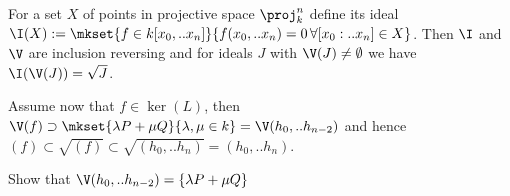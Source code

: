 \begin{theorem}
For a set $X$ of points in projective space $\proj^n_k$ define its ideal $\I(X) := \mkset{f \in k[x_0,..x_n]}{f(x_0,..x_n) = 0\,\forall [x_0:..x_n] \in X}$.
Then $\I$ and $\V$ are inclusion reversing and for ideals $J$ with $\V(J) \neq \emptyset$ we have $\I(\V(J)) = \sqrt{J}$.
\end{theorem}

Assume now that $f \in \ker(L)$, then $\V(f) \supset \mkset{\lambda P + \mu Q}{\lambda, \mu \in k} = \V(h_0,..h_{n-2})$ and hence $(f) \subset \sqrt{(f)} \subset \sqrt{(h_0,..h_n)} = (h_0,..h_n)$.

\begin{todo}
\item Show that $\V(h_0,..h_{n-2}) = \{ \lambda P + \mu Q \}$
\end{todo}


